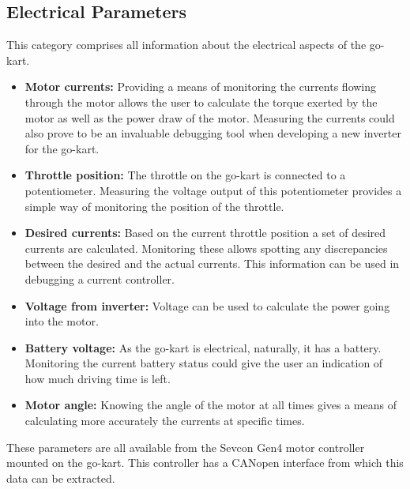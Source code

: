 \subsection{Electrical Parameters}
This category comprises all information about the electrical aspects of the go-kart.
\begin{itemize}
	\item \textbf{Motor currents:} Providing a means of monitoring the currents flowing through the motor allows the user to calculate the torque exerted by the motor as well as the power draw of the motor.
	Measuring the currents could also prove to be an invaluable debugging tool when developing a new inverter for the go-kart.
	\item \textbf{Throttle position:} The throttle on the go-kart is connected to a potentiometer.
	Measuring the voltage output of this potentiometer provides a simple way of monitoring the position of the throttle.
	\item \textbf{Desired currents:} Based on the current throttle position a set of desired currents are calculated.
	Monitoring these allows spotting any discrepancies between the desired and the actual currents.
	This information can be used in debugging a current controller.
	\item \textbf{Voltage from inverter:} Voltage can be used to calculate the power going into the motor.
	\item \textbf{Battery voltage:} As the go-kart is electrical, naturally, it has a battery.
	Monitoring the current battery status could give the user an indication of how much driving time is left.
	\item \textbf{Motor angle:} Knowing the angle of the motor at all times gives a means of calculating more accurately the currents at specific times.
\end{itemize}
These parameters are all available from the Sevcon Gen4 motor controller mounted on the go-kart.
This controller has a CANopen interface from which this data can be extracted.
